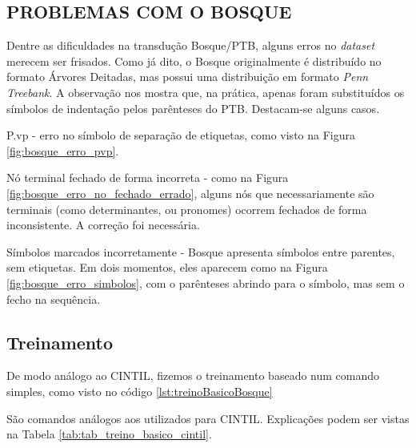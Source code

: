 \subsection{PROBLEMAS COM O BOSQUE}
\label{subsec:erros_bosque}
Dentre as dificuldades na transdução Bosque/PTB, alguns erros no \textit{dataset} merecem ser frisados. Como já dito, o Bosque originalmente é distribuído no formato Árvores Deitadas, mas possui uma distribuição em formato \textit{Penn Treebank}. A observação nos mostra que, na prática, apenas foram substituídos os símbolos de indentação pelos parênteses do PTB. 
Destacam-se alguns casos.

P.vp - erro no símbolo de separação de etiquetas, como visto na Figura \ref{fig:bosque_erro_pvp}.

\begin{center}
    
\end{center}

Nó terminal fechado de forma incorreta - como na Figura \ref{fig:bosque_erro_no_fechado_errado}, alguns nós que necessariamente são terminais (como determinantes, ou pronomes) ocorrem fechados de forma inconsistente. A correção foi necessária.

\begin{center}
    
\end{center}

Símbolos marcados incorretamente - Bosque apresenta símbolos entre parentes, sem etiquetas. Em dois momentos, eles aparecem como na Figura \ref{fig:bosque_erro_simbolos}, com o parênteses abrindo para o símbolo, mas sem o fecho na sequência. 

\begin{center}
    
\end{center}

\subsection{Treinamento}
\label{subsec:treinamento_bosque}
De modo análogo ao CINTIL, fizemos o treinamento baseado num comando simples, como visto no código \ref{lst:treinoBasicoBosque}
\begin{center}
    
\end{center}
São comandos análogos aos utilizados para CINTIL. Explicações podem ser vistas na Tabela \ref{tab:tab_treino_basico_cintil}.

